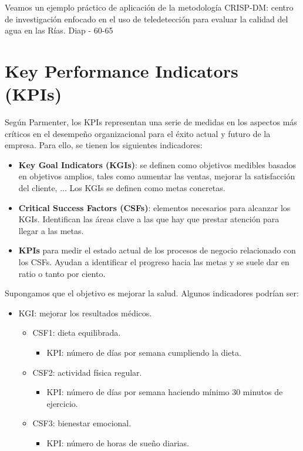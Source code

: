 \begin{example}
    Veamos un ejemplo práctico de aplicación de la metodología CRISP-DM: centro de investigación enfocado en el uso de teledetección para evaluar la calidad del agua en las Rías. Diap - 60-65
\end{example}

\section{Key Performance Indicators (KPIs)}

Según Parmenter, los KPIs representan una serie de medidas en los aspectos más críticos en el desempeño organizacional para el éxito actual y futuro de la empresa. Para ello, se tienen los siguientes indicadores:
\begin{itemize}
\item \textbf{Key Goal Indicators (KGIs)}: se definen como objetivos medibles basados en objetivos amplios, tales como aumentar las ventas, mejorar la satisfacción del cliente, ... Los KGIs se definen como metas concretas.
\item \textbf{Critical Success Factors (CSFs)}: elementos necesarios para alcanzar los KGIs. Identifican las áreas clave a las que hay que prestar atención para llegar a las metas.
\item \textbf{KPIs} para medir el estado actual de los procesos de negocio relacionado con los CSFs. Ayudan a identificar el progreso hacia las metas y se suele dar en ratio o tanto por ciento.
\end{itemize}

\begin{example}
Supongamos que el objetivo es mejorar la salud. Algunos indicadores podrían ser:
\begin{itemize}
\item KGI: mejorar los resultados médicos.
\begin{itemize}
\item CSF1: dieta equilibrada.
\begin{itemize}
\item KPI: número de días por semana cumpliendo la dieta.
\end{itemize}
\item CSF2: actividad física regular.
\begin{itemize}
\item KPI: número de días por semana haciendo mínimo 30 minutos de ejercicio.
\end{itemize}
\item CSF3: bienestar emocional.
\begin{itemize}
\item KPI: número de horas de sueño diarias.
\end{itemize}
\end{itemize}
\end{itemize}
\end{example}

